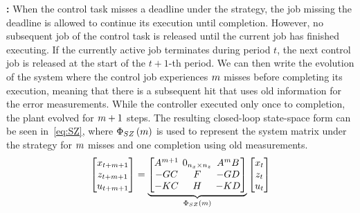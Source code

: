 \textbf{\tSZ{}: }%
%
When the control task misses a deadline under the \tS{} strategy, the job missing the deadline is allowed to continue its execution until completion.
However, no subsequent job of the control task is released until the current job has finished executing.
If the currently active job terminates during period $t$, the next control job is released at the start of the $t+1$-th period.
We can then write the evolution of the system where the control job experiences $m$ misses before completing its execution, meaning that there is a subsequent hit that uses old information for the error measurements.
While the controller executed only once to completion, the plant evolved for $m+1$ steps.
The resulting closed-loop state-space form can be seen in~\eqref{eq:SZ}, where $\Phi{}_{SZ}\left( m \right)$ is used to represent the system matrix under the \tSZ{} strategy for $m$ misses and one completion using old measurements.
%
\begin{equation}
\setlength\arraycolsep{2pt}
\label{eq:SZ}
    \begin{bmatrix}
        x_{t+\nummisses+1} \\
        z_{t+\nummisses+1} \\
        u_{t+\nummisses+1}
    \end{bmatrix} = 
    \underbrace{\begin{bmatrix}
        \Ap^{\nummisses+1}  & 0_{n_x \times n_z}  & \Ap^\nummisses \Bp \\
        -\Bc\Cp             & \Ac                                       & -\Bc\Dp \\
        -\Dc\Cp             & \Cc                                       & -\Dc\Dp
    \end{bmatrix}}_{\clmat{}_{SZ}\funof{\nummisses}}
    \begin{bmatrix}
        x_{t} \\
        z_{t} \\
        u_{t}
    \end{bmatrix}
\end{equation}

